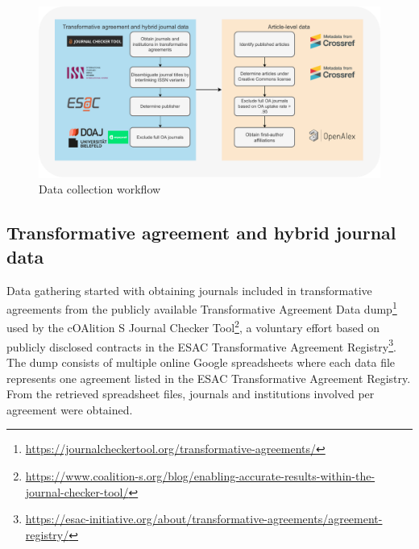 \documentclass[a4paper,man,floatsintext,longtable,noextraspace,12pt]{apa6}
\begin{document}
\begin{figure}[ht!]

{\centering \includegraphics[width=0.99\linewidth,]{data_collection_workflow} 

}

\caption{Data collection workflow}\label{fig:data_workflow}
\end{figure}

\subsection{Transformative agreement and hybrid journal
data}\label{transformative-agreement-and-hybrid-journal-data}

Data gathering started with obtaining journals included in
transformative agreements from the publicly available Transformative
Agreement Data dump\footnote{\url{https://journalcheckertool.org/transformative-agreements/}}
used by the cOAlition S Journal Checker Tool\footnote{\url{https://www.coalition-s.org/blog/enabling-accurate-results-within-the-journal-checker-tool/}},
a voluntary effort based on publicly disclosed contracts in the ESAC
Transformative Agreement Registry\footnote{\url{https://esac-initiative.org/about/transformative-agreements/agreement-registry/}}.
The dump consists of multiple online Google spreadsheets where each data
file represents one agreement listed in the ESAC Transformative
Agreement Registry. From the retrieved spreadsheet files, journals and
institutions involved per agreement were obtained.
\end{document}
